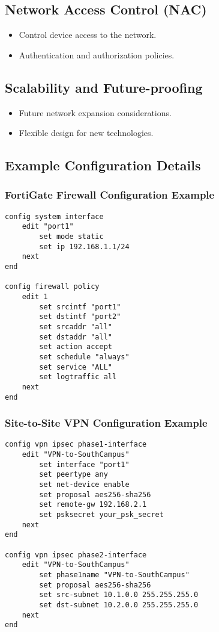 \documentclass[12pt]{report}
\begin{document}
\subsection{Network Access Control (NAC)}
\begin{itemize}
    \item Control device access to the network.
    \item Authentication and authorization policies.
\end{itemize}

\subsection{Scalability and Future-proofing}
\begin{itemize}
    \item Future network expansion considerations.
    \item Flexible design for new technologies.
\end{itemize}

\subsection{Example Configuration Details}

\subsubsection{FortiGate Firewall Configuration Example} 
\begin{verbatim}
config system interface
    edit "port1"
        set mode static
        set ip 192.168.1.1/24
    next
end

config firewall policy
    edit 1
        set srcintf "port1"
        set dstintf "port2"
        set srcaddr "all"
        set dstaddr "all"
        set action accept
        set schedule "always"
        set service "ALL"
        set logtraffic all
    next
end
\end{verbatim}

\subsubsection{Site-to-Site VPN Configuration Example}
\begin{verbatim}
config vpn ipsec phase1-interface
    edit "VPN-to-SouthCampus"
        set interface "port1"
        set peertype any
        set net-device enable
        set proposal aes256-sha256
        set remote-gw 192.168.2.1
        set psksecret your_psk_secret
    next
end

config vpn ipsec phase2-interface
    edit "VPN-to-SouthCampus"
        set phase1name "VPN-to-SouthCampus"
        set proposal aes256-sha256
        set src-subnet 10.1.0.0 255.255.255.0
        set dst-subnet 10.2.0.0 255.255.255.0
    next
end
\end{verbatim}
\end{document}
